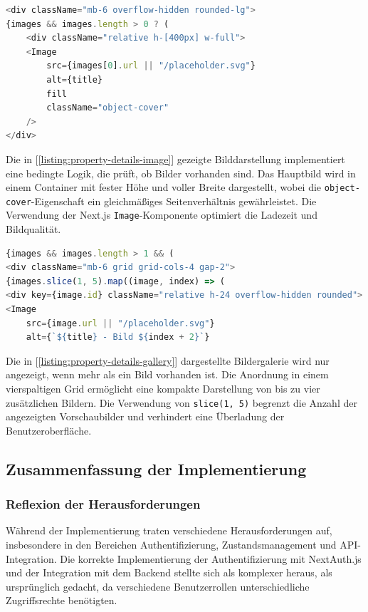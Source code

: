 \begin{lstlisting}[language=JavaScript, caption={Bilddarstellung.}, label={listing:property-details-image}]
<div className="mb-6 overflow-hidden rounded-lg">
{images && images.length > 0 ? (
    <div className="relative h-[400px] w-full">
	<Image
		src={images[0].url || "/placeholder.svg"}
	    alt={title}
	    fill
		className="object-cover"
	/>
</div>
\end{lstlisting}

								
								Die in [\ref{listing:property-details-image}] gezeigte Bilddarstellung implementiert eine bedingte Logik, die prüft, ob Bilder vorhanden sind. Das Hauptbild wird in einem Container mit fester Höhe und voller Breite dargestellt, wobei die \texttt{object-cover}-Eigenschaft ein gleichmäßiges Seitenverhältnis gewährleistet. Die Verwendung der Next.js \texttt{Image}-Komponente optimiert die Ladezeit und Bildqualität.
								
								
\begin{lstlisting}[language=JavaScript, caption={Galerie für zusätzliche Bilder.}, label={listing:property-details-gallery}]
{images && images.length > 1 && (
<div className="mb-6 grid grid-cols-4 gap-2">
{images.slice(1, 5).map((image, index) => (
<div key={image.id} className="relative h-24 overflow-hidden rounded">
<Image
	src={image.url || "/placeholder.svg"}
	alt={`${title} - Bild ${index + 2}`}
\end{lstlisting}

										
										Die in [\ref{listing:property-details-gallery}] dargestellte Bildergalerie wird nur angezeigt, wenn mehr als ein Bild vorhanden ist. Die Anordnung in einem vierspaltigen Grid ermöglicht eine kompakte Darstellung von bis zu vier zusätzlichen Bildern. Die Verwendung von \texttt{slice(1, 5)} begrenzt die Anzahl der angezeigten Vorschaubilder und verhindert eine Überladung der Benutzeroberfläche.
										
										\subsection{Zusammenfassung der Implementierung}
										
										\subsubsection{Reflexion der Herausforderungen}
										Während der Implementierung traten verschiedene Herausforderungen auf, insbesondere in den Bereichen Authentifizierung, Zustandsmanagement und API-Integration. Die korrekte Implementierung der Authentifizierung mit NextAuth.js und der Integration mit dem Backend stellte sich als komplexer heraus, als ursprünglich gedacht, da verschiedene Benutzerrollen unterschiedliche Zugriffsrechte benötigten.
										
